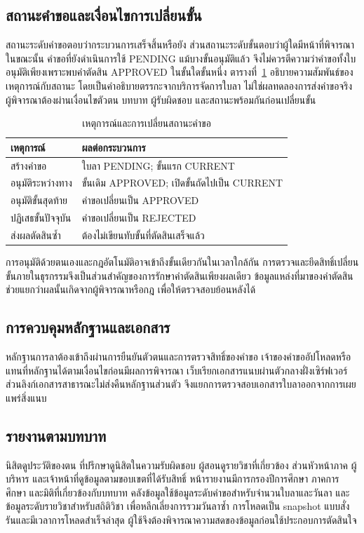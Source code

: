 \subsection{สถานะคำขอและเงื่อนไขการเปลี่ยนขั้น}
สถานะระดับคำขอตอบว่ากระบวนการเสร็จสิ้นหรือยัง ส่วนสถานะระดับขั้นตอบว่าผู้ใดมีหน้าที่พิจารณาในขณะนั้น คำขอที่ยังดำเนินการใช้ PENDING แม้บางขั้นอนุมัติแล้ว จึงไม่ควรตีความว่าคำขอทั้งใบอนุมัติเพียงเพราะพบคำตัดสิน APPROVED ในขั้นใดขั้นหนึ่ง
ตารางที่~\ref{tab:state-transition} อธิบายความสัมพันธ์ของเหตุการณ์กับสถานะ โดยเป็นคำอธิบายตรรกะจากบริการจัดการใบลา ไม่ใช่ผลทดลองการส่งคำขอจริง ผู้พิจารณาต้องผ่านเงื่อนไขตัวตน บทบาท ผู้รับผิดชอบ และสถานะพร้อมกันก่อนเปลี่ยนขั้น
\begin{table}[ht]
\caption{เหตุการณ์และการเปลี่ยนสถานะคำขอ}\label{tab:state-transition}
\centering
\begin{tabularx}{\columnwidth}{|p{25mm}|X|}
\hline
เหตุการณ์ & ผลต่อกระบวนการ \\ \hline
สร้างคำขอ & ใบลา PENDING; ขั้นแรก CURRENT \\ \hline
อนุมัติระหว่างทาง & ขั้นเดิม APPROVED; เปิดขั้นถัดไปเป็น CURRENT \\ \hline
อนุมัติขั้นสุดท้าย & คำขอเปลี่ยนเป็น APPROVED \\ \hline
ปฏิเสธขั้นปัจจุบัน & คำขอเปลี่ยนเป็น REJECTED \\ \hline
ส่งผลตัดสินซ้ำ & ต้องไม่เขียนทับขั้นที่ตัดสินเสร็จแล้ว \\ \hline
\end{tabularx}
\end{table}
การอนุมัติด้วยตนเองและกฎอัตโนมัติอาจเข้าถึงขั้นเดียวกันในเวลาใกล้กัน การตรวจและยึดสิทธิ์เปลี่ยนขั้นภายในธุรกรรมจึงเป็นส่วนสำคัญของการรักษาคำตัดสินเพียงผลเดียว ข้อมูลแหล่งที่มาของคำตัดสินช่วยแยกว่าผลนั้นเกิดจากผู้พิจารณาหรือกฎ เพื่อให้ตรวจสอบย้อนหลังได้
\subsection{การควบคุมหลักฐานและเอกสาร}
หลักฐานการลาต้องเข้าถึงผ่านการยืนยันตัวตนและการตรวจสิทธิ์ของคำขอ เจ้าของคำขออัปโหลดหรือแทนที่หลักฐานได้ตามเงื่อนไขก่อนมีผลการพิจารณา เว็บเรียกเอกสารแนบผ่านตัวกลางฝั่งเซิร์ฟเวอร์ ส่วนลิงก์เอกสารสาธารณะไม่ส่งคืนหลักฐานส่วนตัว จึงแยกการตรวจสอบเอกสารใบลาออกจากการเผยแพร่สิ่งแนบ
\subsection{รายงานตามบทบาท}
นิสิตดูประวัติของตน ที่ปรึกษาดูนิสิตในความรับผิดชอบ ผู้สอนดูรายวิชาที่เกี่ยวข้อง ส่วนหัวหน้าภาค ผู้บริหาร และเจ้าหน้าที่ดูข้อมูลตามขอบเขตที่ได้รับสิทธิ์ หน้ารายงานมีการกรองปีการศึกษา ภาคการศึกษา และมิติที่เกี่ยวข้องกับบทบาท
คลังข้อมูลใช้ข้อมูลระดับคำขอสำหรับจำนวนใบลาและวันลา และข้อมูลระดับรายวิชาสำหรับสถิติวิชา เพื่อหลีกเลี่ยงการรวมวันลาซ้ำ การโหลดเป็น snapshot แบบสั่งรันและมีเวลาการโหลดสำเร็จล่าสุด ผู้ใช้จึงต้องพิจารณาความสดของข้อมูลก่อนใช้ประกอบการตัดสินใจ

